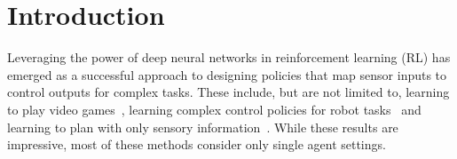 \documentclass{article}
\begin{document}
\section{Introduction}
Leveraging the power of deep neural networks in reinforcement learning (RL) has emerged as a successful approach to designing policies that map sensor inputs to control outputs for complex tasks. These include, but are not limited to, learning to play video games~\cite{dqn,mnih2016asynchronous}, learning complex control policies for robot tasks~\cite{visuomotor} and learning to plan with only sensory information~\cite{pathak2017curiosity,macn,gupta2017cognitive}. While these results are impressive, most of these methods consider only single agent settings. 
\end{document}
